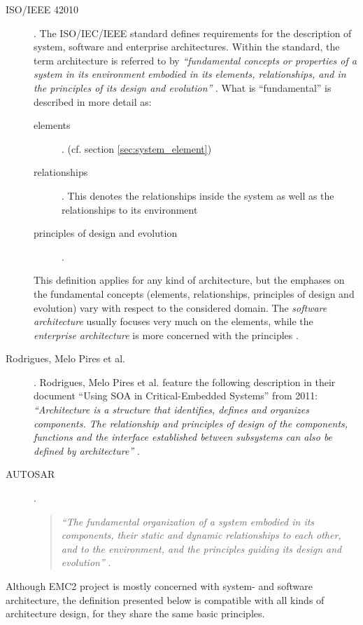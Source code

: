 \begin{description}
\item [ISO/IEEE 42010].
The ISO/IEC/IEEE standard defines requirements for the description of system, software and enterprise architectures. Within the standard, the term architecture is referred to by \emph{``fundamental concepts or properties of a system in its environment embodied in its elements, relationships, and in the principles of its design and evolution''} \cite{ISO_42010}. What is ``fundamental'' is described in more detail as:
	\begin{description}
		\item [elements]. (cf. section \ref{sec:system_element})
		\item [relationships]. This denotes the relationships inside the system as well as the relationships to its environment
		\item [principles of design and evolution].
	\end{description}
This definition applies for any kind of architecture, but the emphases on the fundamental concepts (elements, relationships, principles of design and evolution) vary with respect to the considered domain. The \emph{software architecture} usually focuses very much on the elements, while the \emph{enterprise architecture} is more concerned with the principles \cite{ISO_42010}.

\item [Rodrigues, Melo Pires et al.].
Rodrigues, Melo Pires et al. feature the following description in their document ``Using SOA in Critical-Embedded Systems'' from 2011:
\emph{``Architecture is a structure that identifies, defines and organizes components. The relationship and principles of design of the components, functions and the interface established between subsystems can also be defined by architecture''} \cite{rodrigues2011}.

\item [AUTOSAR].
\begin{quote}
\emph{``The fundamental organization of a system embodied in its components, their static and dynamic relationships to each other, and to the environment, and the principles guiding its design and evolution''} \cite{autosar_glossary}.
\end{quote}
\end{description}
 


Although EMC2 project is mostly concerned with system- and software architecture, the definition presented below is compatible with all kinds of architecture design, for they share the same basic principles.

